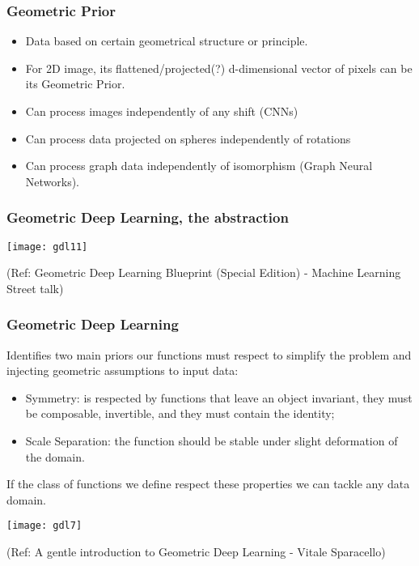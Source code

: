 \begin{frame}[fragile]\frametitle{Geometric Prior}

\begin{itemize}
\item Data based on certain geometrical structure or principle. 
\item For 2D image, its flattened/projected(?) d-dimensional vector of pixels can be its Geometric Prior.
\item Can process images independently of any shift (CNNs)
\item Can process data projected on spheres independently of rotations
\item Can process graph data independently of isomorphism (Graph Neural Networks).
\end{itemize}
	
\end{frame}

\begin{frame}[fragile]\frametitle{Geometric Deep Learning, the abstraction}

\begin{center}
\texttt{[image: gdl11]}
\end{center}

{\tiny (Ref: Geometric Deep Learning Blueprint (Special Edition) - Machine Learning Street talk)}
	
\end{frame}


\begin{frame}[fragile]\frametitle{Geometric Deep Learning}

Identifies two main priors our functions must respect to simplify the problem and injecting geometric assumptions to input data:

\begin{itemize}
\item Symmetry: is respected by functions that leave an object invariant, they must be composable, invertible, and they must contain the identity;
\item Scale Separation: the function should be stable under slight deformation of the domain.
\end{itemize}
	
	 If the class of functions we define respect these properties we can tackle any data domain.
	 
\begin{center}
\texttt{[image: gdl7]}
\end{center}

{\tiny (Ref: A gentle introduction to Geometric Deep Learning - Vitale Sparacello)}	
\end{frame}

